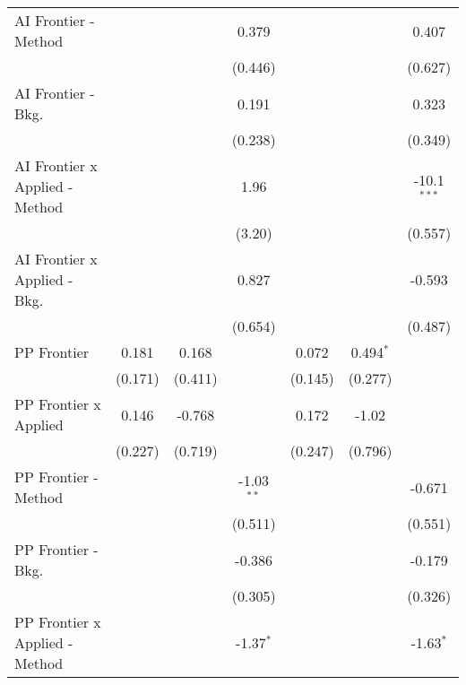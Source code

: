 \begin{tabular}{lcccccc}
   AI Frontier - Method           &             &              & 0.379        &              &             & 0.407\\   
                                  &             &              & (0.446)      &              &             & (0.627)\\   
   AI Frontier - Bkg.             &             &              & 0.191        &              &             & 0.323\\   
                                  &             &              & (0.238)      &              &             & (0.349)\\   
   AI Frontier x Applied - Method &             &              & 1.96         &              &             & -10.1$^{***}$\\   
                                  &             &              & (3.20)       &              &             & (0.557)\\   
   AI Frontier x Applied - Bkg.   &             &              & 0.827        &              &             & -0.593\\   
                                  &             &              & (0.654)      &              &             & (0.487)\\   
   PP Frontier                    & 0.181       & 0.168        &              & 0.072        & 0.494$^{*}$ &   \\   
                                  & (0.171)     & (0.411)      &              & (0.145)      & (0.277)     &   \\   
   PP Frontier x Applied          & 0.146       & -0.768       &              & 0.172        & -1.02       &   \\   
                                  & (0.227)     & (0.719)      &              & (0.247)      & (0.796)     &   \\   
   PP Frontier - Method           &             &              & -1.03$^{**}$ &              &             & -0.671\\   
                                  &             &              & (0.511)      &              &             & (0.551)\\   
   PP Frontier - Bkg.             &             &              & -0.386       &              &             & -0.179\\   
                                  &             &              & (0.305)      &              &             & (0.326)\\   
   PP Frontier x Applied - Method &             &              & -1.37$^{*}$  &              &             & -1.63$^{*}$\\   

\end{tabular}
